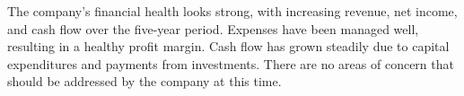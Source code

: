 

The company's financial health looks strong, with increasing revenue, net income, and cash flow over the five-year period. Expenses have been managed well, resulting in a healthy profit margin. Cash flow has grown steadily due to capital expenditures and payments from investments. There are no areas of concern that should be addressed by the company at this time.